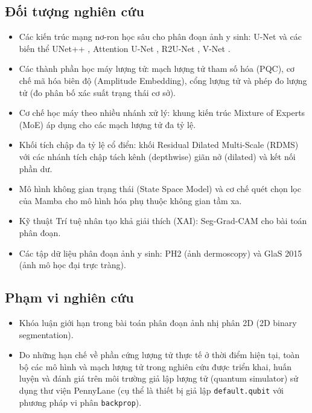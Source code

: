 \subsection{Đối tượng nghiên cứu}
\begin{itemize}
    \item Các kiến trúc mạng nơ-ron học sâu cho phân đoạn ảnh y sinh: U-Net \cite{ronneberger2015unet} và các biến thể UNet++ \cite{zhou2018unetplusplus}, Attention U-Net \cite{oktay2018attention}, R2U-Net \cite{alom2018r2unet}, V-Net \cite{milletari2016vnet}.
    \item Các thành phần học máy lượng tử: mạch lượng tử tham số hóa (PQC), cơ chế mã hóa biên độ (Amplitude Embedding), cổng lượng tử và phép đo lượng tử (đo phân bố xác suất trạng thái cơ sở).
    \item Cơ chế học máy theo nhiều nhánh xử lý: khung kiến trúc Mixture of Experts (MoE) áp dụng cho các mạch lượng tử đa tỷ lệ.
    \item Khối tích chập đa tỷ lệ cổ điển: khối Residual Dilated Multi-Scale (RDMS) với các nhánh tích chập tách kênh (depthwise) giãn nở (dilated) và kết nối phần dư.
    \item Mô hình không gian trạng thái (State Space Model) và cơ chế quét chọn lọc của Mamba \cite{gu2023mamba} cho mô hình hóa phụ thuộc không gian tầm xa.
    \item Kỹ thuật Trí tuệ nhân tạo khả giải thích (XAI): Seg-Grad-CAM \cite{vinogradova2020seggradcam} cho bài toán phân đoạn.
    \item Các tập dữ liệu phân đoạn ảnh y sinh: PH2 \cite{mendonca2013ph2} (ảnh dermoscopy) và GlaS 2015 \cite{sirinukunwattana2017glas} (ảnh mô học đại trực tràng).
\end{itemize}

\subsection{Phạm vi nghiên cứu}
\begin{itemize}
    \item Khóa luận giới hạn trong bài toán phân đoạn ảnh nhị phân 2D (2D binary segmentation).
    \item Do những hạn chế về phần cứng lượng tử thực tế ở thời điểm hiện tại, toàn bộ các mô hình và mạch lượng tử trong nghiên cứu được triển khai, huấn luyện và đánh giá trên môi trường giả lập lượng tử (quantum simulator) sử dụng thư viện PennyLane (cụ thể là thiết bị giả lập \texttt{default.qubit} với phương pháp vi phân \texttt{backprop}).
\end{itemize}

